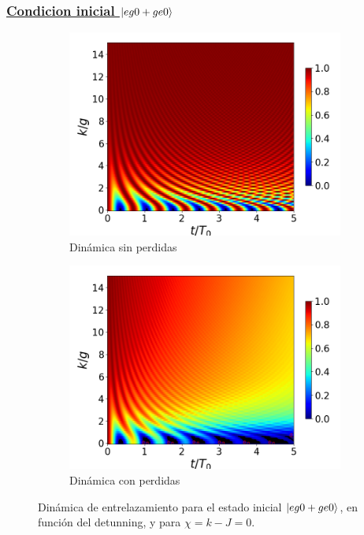 \subsubsection{\underline{Condicion inicial $\ket{eg0+ge0}$}}
\begin{figure}[h]
    \centering
    \begin{subfigure}{0.49\textwidth}
        \includegraphics[width=\textwidth]{figuras/ch4/concu/k/eg0+ge0 d=0.0g x=0.0g J=0.0g gamma=0.25g concu k uni.png}
        \caption{Dinámica sin perdidas}
        \label{fig4:concu k 0 uni}
    \end{subfigure}
    \hfill
    \begin{subfigure}{0.49\textwidth}
        \includegraphics[width=\textwidth]{figuras/ch4/concu/k/eg0+ge0 d=0.0g x=0.0g J=0.0g gamma=0.25g concu k dis.png}
        \caption{Dinámica con perdidas}
        \label{fig4:concu k 0 dis}
    \end{subfigure}
    \caption{Dinámica de entrelazamiento para el estado inicial $\ket{eg0+ge0}$, en función del detunning, y para $\chi=k-J=0$.}
    \label{fig4:concu k 0}
\end{figure}
